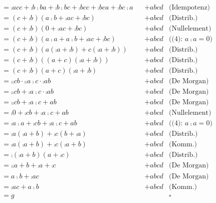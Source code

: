 \documentclass{CInf_practice}
\begin{document}
\begin{align*}
  &= \comp a cc + \comp b \comp b a + \comp b \comp b c + \comp b cc + \comp b c a + \comp b c \comp a && + abcd & \text{(Idempotenz)} \\
  &= \left( c + \comp b \right)\left( a\comp b + \comp a c + \comp b c\right) && + abcd & \text{(Distrib.)} \\
  &= \left( c + \comp b \right)\left( 0 + \comp a c + \comp b c\right) && + abcd & \text{(Nullelement)} \\
  &= \left( c + \comp b \right)\left( a\comp a + a\comp b + \comp a c + \comp b c\right) && + abcd & \text{((4): $a\comp a = 0$)} \\
  &= \left( c + \comp b \right)\left( a\left(\comp a + \comp b\right)+c\left(\comp a + \comp b\right) \right) && + abcd & \text{(Distrib.)} \\
  &= \left( c + \comp b \right)\left( \left(a+c\right)\left(\comp a + \comp b\right)\right) && + abcd & \text{(Distrib.)} \\
  &= \left( c + \comp b \right)\left(a+c\right)\left(\comp a + \comp b\right) && + abcd & \text{(Distrib.)} \\
  &= \comp{\comp c b} \cdot \comp{\comp a \comp c} \cdot \comp{ab} && + abcd & \text{(De Morgan)} \\
  &= \comp{\comp c b +\comp a \comp c} \cdot \comp{ab} && + abcd & \text{(De Morgan)} \\
  &= \comp{\comp c b +\comp a \comp c + ab} && + abcd & \text{(De Morgan)} \\
  &= \comp{0 + \comp c b +\comp a \comp c + ab} && + abcd & \text{(Nullelement)} \\
  &= \comp{a\comp a + \comp c b +\comp a \comp c + ab} && + abcd & \text{((4): $a\comp a=0$)} \\
  &= \comp{a\left(\comp a+ b\right) + \comp c \left(b +\comp a\right)} && + abcd & \text{(Distrib.)} \\
  &= \comp{a\left(\comp a+ b\right) + \comp c \left(\comp a + b\right)} && + abcd & \text{(Komm.)} \\
  &= \comp{\left(\comp a+ b\right) \left(a + \comp c \right)} && + abcd & \text{(Distrib.)} \\
  &= \comp{ \comp a+ b } + \comp{a + \comp c} && + abcd & \text{(De Morgan)} \\
  &= a \comp b + \comp a c && + abcd & \text{(De Morgan)} \\
  &= \comp a c + a \comp b && + abcd & \text{(Komm.)} \\
  &= g && &\square
\end{align*}
\end{document}
